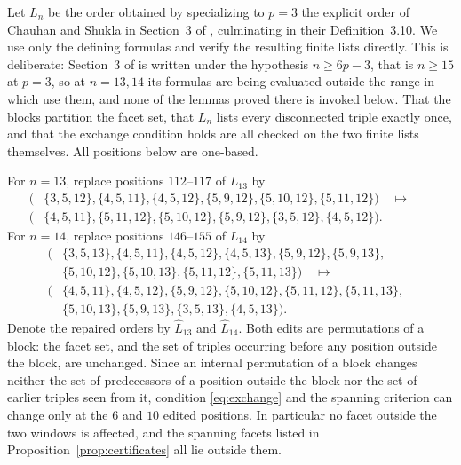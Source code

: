 \documentclass[11pt]{amsart}
\theoremstyle{remark}
\newcommand{\triple}[3]{\{#1,#2,#3\}}
\begin{document}
Let $L_n$ be the order obtained by specializing to $p=3$ the explicit order
of Chauhan and Shukla in Section~3 of \cite{CS}, culminating in their
Definition~3.10.  We use only the defining formulas and verify the resulting
finite lists directly.  This is deliberate: Section~3 of \cite{CS} is written
under the hypothesis $n\ge6p-3$, that is $n\ge15$ at $p=3$, so at $n=13,14$
its formulas are being evaluated outside the range in which \cite{CS} use
them, and none of the lemmas proved there is invoked below.  That the blocks
partition the facet set, that $L_n$ lists every disconnected triple exactly
once, and that the exchange condition holds are all checked on the two finite
lists themselves.  All positions below are one-based.

For $n=13$, replace positions $112$--$117$ of $L_{13}$ by
\begin{equation}\label{eq:r13}
\begin{aligned}
(&\triple{3}{5}{12},\triple{4}{5}{11},\triple{4}{5}{12},
  \triple{5}{9}{12},\triple{5}{10}{12},\triple{5}{11}{12})
\quad\longmapsto\quad{}&\\[-0.3em]
(&\triple{4}{5}{11},\triple{5}{11}{12},\triple{5}{10}{12},
  \triple{5}{9}{12},\triple{3}{5}{12},\triple{4}{5}{12}).&
\end{aligned}
\end{equation}
For $n=14$, replace positions $146$--$155$ of $L_{14}$ by
\begin{equation}\label{eq:r14}
\begin{aligned}
(&\triple{3}{5}{13},\triple{4}{5}{11},\triple{4}{5}{12},
  \triple{4}{5}{13},\triple{5}{9}{12},\triple{5}{9}{13},\\[-0.3em]
 &\triple{5}{10}{12},\triple{5}{10}{13},\triple{5}{11}{12},
  \triple{5}{11}{13})
\quad\longmapsto\quad{}&\\[-0.3em]
(&\triple{4}{5}{11},\triple{4}{5}{12},\triple{5}{9}{12},
  \triple{5}{10}{12},\triple{5}{11}{12},\triple{5}{11}{13},\\[-0.3em]
 &\triple{5}{10}{13},\triple{5}{9}{13},\triple{3}{5}{13},
  \triple{4}{5}{13}).&
\end{aligned}
\end{equation}
Denote the repaired orders by $\widehat L_{13}$ and $\widehat L_{14}$.
Both edits are permutations of a block: the facet set, and the set of triples
occurring before any position outside the block, are unchanged.  Since an
internal permutation of a block changes neither the set of predecessors of a
position outside the block nor the set of earlier triples seen from it,
condition \eqref{eq:exchange} and the spanning criterion can change only at
the $6$ and $10$ edited positions.  In particular no facet outside the two
windows is affected, and the spanning facets listed in
Proposition~\ref{prop:certificates} all lie outside them.
\end{document}
